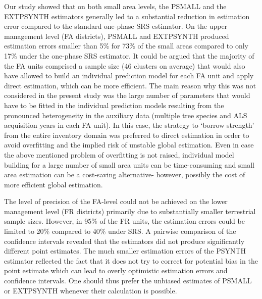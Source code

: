 \documentclass[remotesensing,article,accept,moreauthors,pdftex,10pt,a4paper]{Definitions/mdpi}
\newcommand{\psynth}{PSYNTH}
\newcommand{\psmall}{PSMALL}
\newcommand{\extpsynth}{EXTPSYNTH}
\begin{document}
%

Our study showed that on both small area levels, the \psmall{} and the \extpsynth{} estimators generally led to a substantial reduction in estimation error compared to the standard one-phase SRS estimator. On the upper management level (FA districts), \psmall{} and \extpsynth{} produced estimation errors smaller than 5\% for 73\% of the small areas compared to only 17\% under the one-phase SRS estimator. It could be argued that the majority of the FA units comprised a sample size (46 clusters on average) that would also have allowed to build an individual prediction model for each FA unit and apply direct estimation, which can be more efficient. The main reason why this was not considered in the present study was the large number of parameters that would have to be fitted in the individual prediction models resulting from the pronounced heterogeneity in the auxiliary data (multiple tree species and ALS acquisition years in each FA unit). In this case, the strategy to `borrow strength' from the entire inventory domain was preferred to direct estimation in order to avoid overfitting and the implied risk of unstable global estimation. Even in case the above mentioned problem of overfitting is not raised, individual model building for a large number of small area units can be time-consuming and small area estimation can be a cost-saving alternative- however, possibly the cost of more efficient global estimation.\par

The level of precision of the FA-level could not be achieved on the lower management level (FR districts) primarily due to substantially smaller terrestrial sample sizes. However, in 95\% of the FR units, the estimation errors could be limited to 20\% compared to 40\% under SRS. A pairwise comparison of the confidence intervals revealed that the estimators did not produce significantly different point estimates. The much smaller estimation errors of the \psynth{} estimator reflected the fact that it does not try to correct for potential bias in the point estimate which can lead to overly optimistic estimation errors and confidence intervals. One should thus prefer the unbiased estimates of \psmall{} or \extpsynth{} whenever their calculation is possible.
\end{document}
